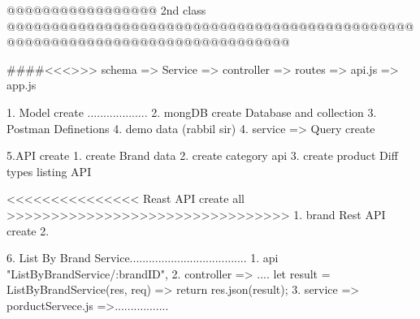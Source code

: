 @@@@@@@@@@@@@@@@@ 2nd class @@@@@@@@@@@@@@@@@@@@@@@@@@@@@@@@@@@@@@@@@@@@@@@@@@@@@@@@@@@@@@@@@@@@@@@@@@@@@@

####<<<>>> schema => Service => controller => routes => api.js => app.js

1. Model create ...................
2. mongDB create Database and collection 
3. Postman Definetions
4. demo data (rabbil sir)
4. service => Query create 

5.API create 
   1. create Brand data 
   2. create category api 
   3. create product Diff types listing API



<<<<<<<<<<<<<<< Reast API create all >>>>>>>>>>>>>>>>>>>>>>>>>>>>>>>>
1. brand Rest API create 
2.

6. List By Brand Service.....................................
   1. api "ListByBrandService/:brandID", 
   2. controller => ....
       let result = ListByBrandService(res, req) => {
        return res.json(result);
       }
   3. service => porductServece.js =>.................
      
